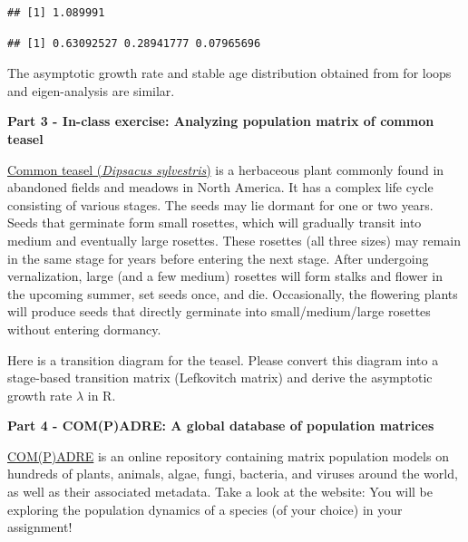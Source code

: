 \documentclass[
]{book}
\newenvironment{Shaded}{\begin{snugshade}}{\end{snugshade}}
\newcommand{\CommentTok}[1]{\textcolor[rgb]{0.56,0.35,0.01}{\textit{#1}}}
\newcommand{\DecValTok}[1]{\textcolor[rgb]{0.00,0.00,0.81}{#1}}
\newcommand{\FunctionTok}[1]{\textcolor[rgb]{0.13,0.29,0.53}{\textbf{#1}}}
\newcommand{\NormalTok}[1]{#1}
\newcommand{\SpecialCharTok}[1]{\textcolor[rgb]{0.81,0.36,0.00}{\textbf{#1}}}
\begin{document}
\begin{verbatim}
## [1] 1.089991
\end{verbatim}

\begin{Shaded}
\end{Shaded}

\begin{verbatim}
## [1] 0.63092527 0.28941777 0.07965696
\end{verbatim}

The asymptotic growth rate and stable age distribution obtained from for loops and eigen-analysis are similar.

\textbf{Part 3 - In-class exercise: Analyzing population matrix of common teasel}

\href{https://en.wikipedia.org/wiki/Dipsacus_fullonum}{Common teasel (\emph{Dipsacus sylvestris})} is a herbaceous plant commonly found in abandoned fields and meadows in North America. It has a complex life cycle consisting of various stages. The seeds may lie dormant for one or two years. Seeds that germinate form small rosettes, which will gradually transit into medium and eventually large rosettes. These rosettes (all three sizes) may remain in the same stage for years before entering the next stage. After undergoing vernalization, large (and a few medium) rosettes will form stalks and flower in the upcoming summer, set seeds once, and die. Occasionally, the flowering plants will produce seeds that directly germinate into small/medium/large rosettes without entering dormancy.

Here is a transition diagram for the teasel. Please convert this diagram into a stage-based transition matrix (Lefkovitch matrix) and derive the asymptotic growth rate \(\lambda\) in R.

\textbf{Part 4 - COM(P)ADRE: A global database of population matrices}

\href{https://compadre-db.org/ExploreDatabase}{COM(P)ADRE} is an online repository containing matrix population models on hundreds of plants, animals, algae, fungi, bacteria, and viruses around the world, as well as their associated metadata. Take a look at the website: You will be exploring the population dynamics of a species (of your choice) in your assignment!
\end{document}
